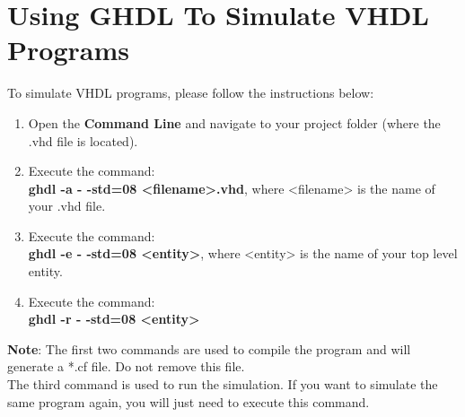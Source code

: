 \section{Using GHDL To Simulate VHDL Programs}
To simulate VHDL programs, please follow the instructions below:
\begin{enumerate}
\item Open the \textbf{Command Line} and navigate to your project folder (where the .vhd file is located).
\item Execute the command:\\  \textbf{ghdl -a - -std=08 <filename>.vhd}, where <filename> is the name of your .vhd file.
\item Execute the command:\\  \textbf{ghdl -e - -std=08 <entity>}, where <entity> is the name of your top level entity.
\item Execute the command:\\  \textbf{ghdl -r - -std=08 <entity>}
\end{enumerate}
\textbf{Note}: The first two commands are used to compile the program and will generate a *.cf file. Do not remove this file.\\
The third command is used to run the simulation. If you want to simulate the same program again, you will just need to execute this command. 